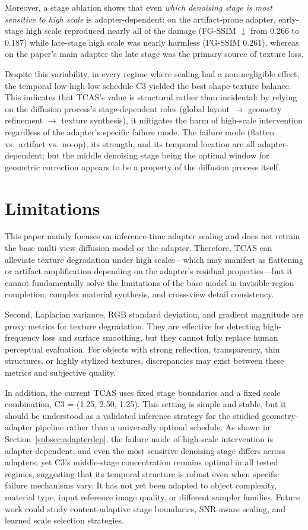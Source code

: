 \documentclass[times,twocolumn,final]{elsarticle}
\begin{document}
Moreover, a stage ablation shows that even \emph{which denoising stage is most sensitive to high scale} is adapter-dependent: on the artifact-prone adapter, early-stage high scale reproduced nearly all of the damage (FG-SSIM $\downarrow$ from 0.266 to 0.187) while late-stage high scale was nearly harmless (FG-SSIM 0.261), whereas on the paper's main adapter the late stage was the primary source of texture loss.

Despite this variability, in every regime where scaling had a non-negligible effect, the temporal low-high-low schedule C3 yielded the best shape-texture balance. This indicates that TCAS's value is structural rather than incidental: by relying on the diffusion process's stage-dependent roles (global layout $\to$ geometry refinement $\to$ texture synthesis), it mitigates the harm of high-scale intervention regardless of the adapter's specific failure mode. The failure mode (flatten vs.\ artifact vs.\ no-op), its strength, and its temporal location are all adapter-dependent; but the middle denoising stage being the optimal window for geometric correction appears to be a property of the diffusion process itself.


\section{Limitations}
\label{sec:limitations}

This paper mainly focuses on inference-time adapter scaling and does not retrain the base multi-view diffusion model or the adapter. Therefore, TCAS can alleviate texture degradation under high scales---which may manifest as flattening or artifact amplification depending on the adapter's residual properties---but it cannot fundamentally solve the limitations of the base model in invisible-region completion, complex material synthesis, and cross-view detail consistency.

Second, Laplacian variance, RGB standard deviation, and gradient magnitude are proxy metrics for texture degradation. They are effective for detecting high-frequency loss and surface smoothing, but they cannot fully replace human perceptual evaluation. For objects with strong reflection, transparency, thin structures, or highly stylized textures, discrepancies may exist between these metrics and subjective quality.

In addition, the current TCAS uses fixed stage boundaries and a fixed scale combination, C3 = (1.25, 2.50, 1.25). This setting is simple and stable, but it should be understood as a validated inference strategy for the studied geometry-adapter pipeline rather than a universally optimal schedule. As shown in Section~\ref{subsec:adapterdep}, the failure mode of high-scale intervention is adapter-dependent, and even the most sensitive denoising stage differs across adapters; yet C3's middle-stage concentration remains optimal in all tested regimes, suggesting that its temporal structure is robust even when specific failure mechanisms vary. It has not yet been adapted to object complexity, material type, input reference image quality, or different sampler families. Future work could study content-adaptive stage boundaries, SNR-aware scaling, and learned scale selection strategies.
\end{document}

